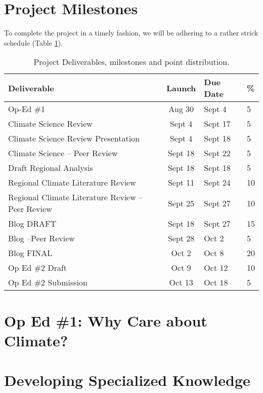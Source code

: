 \documentclass{article}\usepackage[]{graphicx}\usepackage[]{color}
\begin{document}
\section{Project Milestones}

To complete the project in a timely fashion, we will be adhering to a rather strick schedule (Table \ref{tab:milestones}).

\begin{table}[h]

\caption{Project Deliverables, milestones and point distribution.}\label{tab:milestones}
\begin{tabular}{lcll}\hline
Deliverable                     & Launch    & Due Date  & \% \\\hline\hline
Op-Ed \#1                   & Aug 30    & Sept 4    & 5 \\
Climate Science Review      & Sept 4    & Sept 17   & 5 \\
Climate Science Review Presentation& Sept 4    & Sept 18   & 5 \\
Climate Science -- Peer Review  & Sept 18 & Sept 22 & 5 \\
Draft Regional Analysis     & Sept 18   & Sept 18   & 5 \\
Regional Climate Literature Review    & Sept 11   & Sept 24   & 10 \\
Regional Climate Literature Review -- Peer Review & Sept 25   & Sept 27 & 10 \\
Blog DRAFT                  & Sept 18   & Sept 27    & 15 \\
Blog --Peer Review          & Sept 28   & Oct 2     & 5\\
Blog FINAL                  & Oct 2     & Oct 8    & 20 \\
Op Ed \#2 Draft             & Oct 9     & Oct 12    & 10 \\
Op Ed \#2 Submission        & Oct 13    & Oct 18    & 5 \\ \hline
\end{tabular}
\end{table}

\section{Op Ed \#1: Why Care about Climate?}



\section{Developing Specialized Knowledge}
\end{document}
